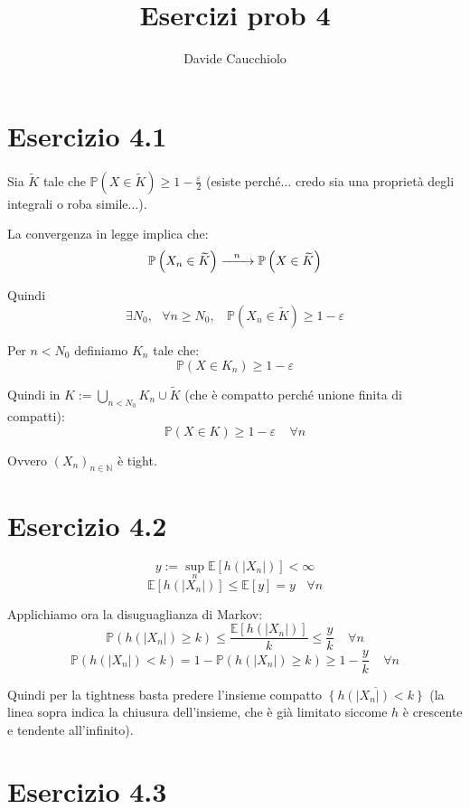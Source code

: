 \documentclass{article}
\title{Esercizi prob 4}
\author{Davide Caucchiolo}
\newcommand{\myrightarrow}[1]{\xrightarrow{\makebox[2em][c]{$\scriptstyle#1$}}}
\begin{document}
\maketitle
\section{Esercizio 4.1}
Sia $\widetilde{K}$ tale che $\mathbb{P}\left(X\in \widetilde{K}\right) \geq  1-\frac{\varepsilon }{2}$ (esiste perché... credo sia una proprietà degli integrali o roba simile...).

La convergenza in legge implica che:
\[
	\mathbb{P}\left(X_n\in \widetilde{K}\right) \myrightarrow{n} \mathbb{P}\left(X\in \widetilde{K}\right)
\]

Quindi
\[
	\exists N_0,\ \ \ \forall n\geq N_0,\ \ \ \ \mathbb{P}\left(X_n\in \widetilde{K}\right)\geq 1-\varepsilon 
\]

Per $n<N_0$ definiamo $K_n$ tale che:
\[
	\mathbb{P}\left(X\in K_n\right) \geq  1-\varepsilon 
\]

Quindi in $K:= \bigcup_{n<N_0} K_n \cup  \widetilde{K}$ (che è compatto perché unione finita di compatti):
\[
	\mathbb{P}\left(X\in K\right) \geq  1-\varepsilon\ \ \ \ \ \forall n
\]

Ovvero $\left(X_n\right)_{n\in \mathbb{N}}$ è tight.


\section{Esercizio 4.2}
\[
	y:= \sup_n \mathbb{E}\left[h\left(\left|X_n\right|\right)\right] < \infty 
\]
\[
	\mathbb{E}\left[h\left(\left|X_n\right|\right)\right] \leq  \mathbb{E}\left[y\right] = y\ \ \ \ \forall n
\]

Applichiamo ora la disuguaglianza di Markov:
\[
	\mathbb{P}\left(h\left(\left|X_n\right|\right) \geq  k\right) \leq  \frac{\mathbb{E}\left[h\left(\left|X_n\right|\right)\right]}{k} \leq  \frac{y}{k}\ \ \ \ \ \forall n
\]
\[
	\mathbb{P}\left(h\left(\left|X_n\right|\right) < k\right) = 1- \mathbb{P}\left(h\left(\left|X_n\right|\right) \geq  k\right) \geq  1-\frac{y}{k}\ \ \ \ \ \forall n
\]

Quindi per la tightness basta predere l'insieme compatto $\overline{\left\{h\left(\left|X_n\right|\right) < k\right\}}$ (la linea sopra indica la chiusura dell'insieme, che è già limitato siccome $h$ è crescente e tendente all'infinito).


\section{Esercizio 4.3}
\end{document}
